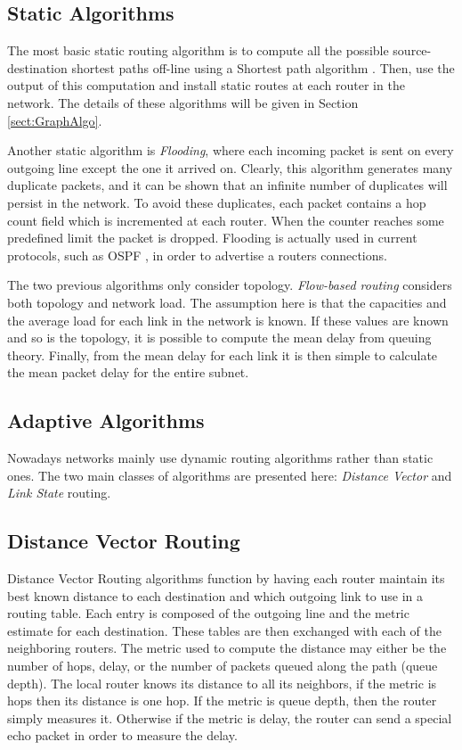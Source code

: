 \subsection{Static Algorithms}
\label{sect:static}
The most basic static routing algorithm is to compute all the possible source-destination shortest paths off-line using a Shortest path algorithm \cite{DIJK, WARSHALL1962, Bellman1958}. Then, use the output of this computation and install static routes at each router in the network. The details of these algorithms will be given in Section \ref{sect:GraphAlgo}.

Another static algorithm is \textit{Flooding}, where each incoming packet is sent on every outgoing line except the one it arrived on. Clearly, this algorithm generates many duplicate packets, and it can be shown that an infinite number of duplicates will persist in the network. To avoid these duplicates, each packet contains a hop count field which is incremented at each router. When the counter reaches some predefined limit the packet is dropped. Flooding is actually used in current protocols, such as OSPF \cite{OSPF}, in order to advertise a routers connections.

The two previous algorithms only consider topology. \textit{Flow-based routing} considers both topology and network load. The assumption here is that the capacities and the average load for each link in the network is known. If these values are known and so is the topology, it is possible to compute the mean delay from queuing theory. Finally, from the mean delay for each link it is then simple to calculate the mean packet delay for the entire subnet. 

\subsection{Adaptive Algorithms}

Nowadays networks mainly use dynamic routing algorithms rather than static ones. The two main classes of algorithms are presented here: \textit{Distance Vector} and \textit{Link State} routing.

\subsection{Distance Vector Routing}

Distance Vector Routing algorithms function by having each router maintain its best known distance to each destination and which outgoing link to use in a routing table. Each entry is composed of the outgoing line and the metric estimate for each destination.  These tables are then exchanged with each of the neighboring routers. The metric used to compute the distance may either be the number of hops, delay, or the number of packets queued along the path (queue depth). The local router knows its distance to all its neighbors, if the metric is hops then its distance is one hop. If the metric is queue depth, then the router simply measures it. Otherwise if the metric is delay, the router can send a special echo packet in order to measure the delay. 

